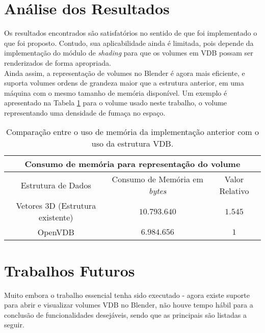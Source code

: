 \section{Análise dos Resultados}

Os resultados encontrados são satisfatórios no sentido de que foi implementado o que foi proposto. Contudo, sua aplicabilidade ainda é limitada, pois depende da implementação do módulo de \emph{shading} para que os volumes em VDB possam ser renderizados de forma apropriada.\\

Ainda assim, a representação de volumes no Blender é agora mais eficiente, e suporta volumes ordens de grandeza maior que a estrutura anterior, em uma máquina com o mesmo tamanho de memória disponível. Um exemplo é apresentado na Tabela \ref{consumo} para o volume usado neste trabalho, o volume representando uma densidade de fumaça no espaço.

\begin{table}[!h]
	\centering
		\begin{tabular}{|c|c|c|}
\hline

\multicolumn{3}{|c|}{\bf{Consumo de memória para representação do volume}} \\
\hline \hline
Estrutura de Dados & Consumo de Memória em {\it bytes} & Valor Relativo\\

\hline
 
Vetores 3D (Estrutura existente) & $10.793.640$ &  $1.545$  \\

\hline
 
OpenVDB & $6.984.656$ & $1$ \\

\hline
 

\end{tabular}
	\caption{Comparação entre o uso de memória da implementação anterior com o uso da estrutura VDB.}
	\label{consumo}
\end{table}

\section{Trabalhos Futuros}

Muito embora o trabalho essencial tenha sido executado - agora existe suporte para abrir e visualizar volumes VDB no Blender, não houve tempo hábil para a conclusão de funcionalidades desejáveis, sendo que as principais são listadas a seguir.

